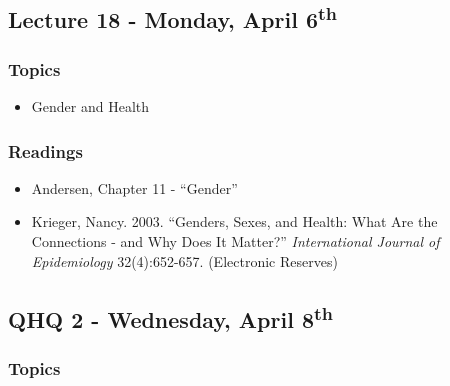 \documentclass[]{book}
\providecommand{\tightlist}{%
  \setlength{\itemsep}{0pt}\setlength{\parskip}{0pt}}
\begin{document}
\hypertarget{lecture-18---monday-april-6th}{%
\subsection*{\texorpdfstring{Lecture 18 - Monday, April 6\textsuperscript{th}}{Lecture 18 - Monday, April 6th}}\label{lecture-18---monday-april-6th}}

\hypertarget{topics-22}{%
\subsubsection*{Topics}\label{topics-22}}

\begin{itemize}
\tightlist
\item
  Gender and Health
\end{itemize}

\hypertarget{readings-20}{%
\subsubsection*{Readings}\label{readings-20}}

\begin{itemize}
\tightlist
\item
  Andersen, Chapter 11 - ``Gender''
\item
  Krieger, Nancy. 2003. ``Genders, Sexes, and Health: What Are the Connections - and Why Does It Matter?'' \emph{International Journal of Epidemiology} 32(4):652-657. (Electronic Reserves)
\end{itemize}

\hypertarget{qhq-2---wednesday-april-8th}{%
\subsection*{\texorpdfstring{QHQ 2 - Wednesday, April 8\textsuperscript{th}}{QHQ 2 - Wednesday, April 8th}}\label{qhq-2---wednesday-april-8th}}

\hypertarget{topics-23}{%
\subsubsection*{Topics}\label{topics-23}}
\end{document}
